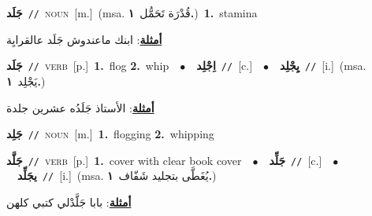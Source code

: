 \documentclass[10pt,a4paper,twoside]{article} %
\begin{document}
\begin{multicols}{2}
{\setlength\topsep{0pt}\textbf{\foreignlanguage{arabic}{جَلَد}}\ {\color{gray}\texttt{//}\color{black}}\ \textsc{noun}\ [m.]\ \color{gray}(msa. \foreignlanguage{arabic}{قُدْرَة تَحَمُّل}~\foreignlanguage{arabic}{\textbf{١.}})\color{black}\ \textbf{1.}~stamina\  \begin{flushright}\color{gray}\foreignlanguage{arabic}{\textbf{\underline{\foreignlanguage{arabic}{أمثلة}}}: ابنك ماعندوش جَلَد عالقرايِة}\end{flushright}\color{black}} \vspace{2mm}

{\setlength\topsep{0pt}\textbf{\foreignlanguage{arabic}{جَلَد}}\ {\color{gray}\texttt{//}\color{black}}\ \textsc{verb}\ [p.]\ \textbf{1.}~flog  \textbf{2.}~whip\ \ $\bullet$\ \ \setlength\topsep{0pt}\textbf{\foreignlanguage{arabic}{اِجْلِد}}\ {\color{gray}\texttt{//}\color{black}}\ [c.]\ \ $\bullet$\ \ \setlength\topsep{0pt}\textbf{\foreignlanguage{arabic}{يِجْلِد}}\ {\color{gray}\texttt{//}\color{black}}\ [i.]\ \color{gray}(msa. \foreignlanguage{arabic}{يَجْلِد}~\foreignlanguage{arabic}{\textbf{١.}})\color{black}\  \begin{flushright}\color{gray}\foreignlanguage{arabic}{\textbf{\underline{\foreignlanguage{arabic}{أمثلة}}}: الأستاذ جَلَدُه عشرين جلدة}\end{flushright}\color{black}} \vspace{2mm}

{\setlength\topsep{0pt}\textbf{\foreignlanguage{arabic}{جَلِد}}\ {\color{gray}\texttt{//}\color{black}}\ \textsc{noun}\ [m.]\ \textbf{1.}~flogging  \textbf{2.}~whipping\ } \vspace{2mm}

{\setlength\topsep{0pt}\textbf{\foreignlanguage{arabic}{جَلَّد}}\ {\color{gray}\texttt{//}\color{black}}\ \textsc{verb}\ [p.]\ \textbf{1.}~cover with clear book cover\ \ $\bullet$\ \ \setlength\topsep{0pt}\textbf{\foreignlanguage{arabic}{جَلِّد}}\ {\color{gray}\texttt{//}\color{black}}\ [c.]\ \ $\bullet$\ \ \setlength\topsep{0pt}\textbf{\foreignlanguage{arabic}{يجَلِّد}}\ {\color{gray}\texttt{//}\color{black}}\ [i.]\ \color{gray}(msa. \foreignlanguage{arabic}{يُغَطَّى بتجليد شَفّاف}~\foreignlanguage{arabic}{\textbf{١.}})\color{black}\  \begin{flushright}\color{gray}\foreignlanguage{arabic}{\textbf{\underline{\foreignlanguage{arabic}{أمثلة}}}: بابا جَلَّدْلي كتبي كلهن}\end{flushright}\color{black}} \vspace{2mm}


\end{multicols}
\end{document}
